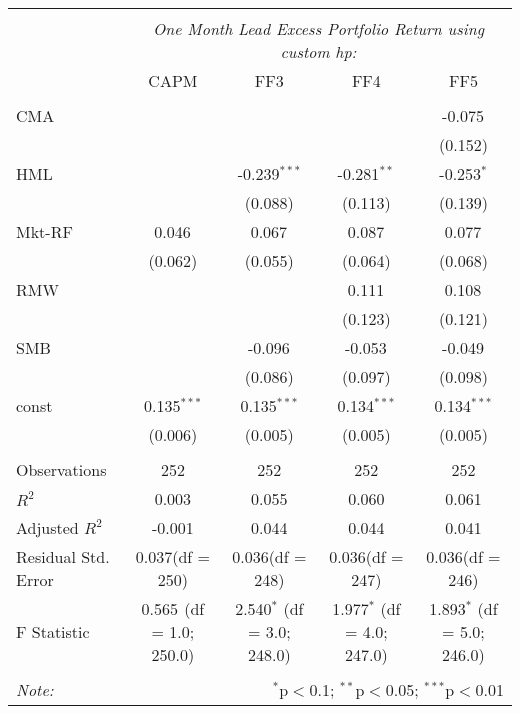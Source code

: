 \begin{table}[!htbp] \centering
\begin{tabular}{@{\extracolsep{5pt}}lcccc}
\\[-1.8ex]\hline
\hline \\[-1.8ex]
& \multicolumn{4}{c}{\textit{One Month Lead Excess Portfolio Return using custom hp:}} \
\cr \cline{4-5}
\\[-1.8ex] & CAPM & FF3 & FF4 & FF5 \\
\hline \\[-1.8ex]
 CMA & & & & -0.075$^{}$ \\
  & & & & (0.152) \\
 HML & & -0.239$^{***}$ & -0.281$^{**}$ & -0.253$^{*}$ \\
  & & (0.088) & (0.113) & (0.139) \\
 Mkt-RF & 0.046$^{}$ & 0.067$^{}$ & 0.087$^{}$ & 0.077$^{}$ \\
  & (0.062) & (0.055) & (0.064) & (0.068) \\
 RMW & & & 0.111$^{}$ & 0.108$^{}$ \\
  & & & (0.123) & (0.121) \\
 SMB & & -0.096$^{}$ & -0.053$^{}$ & -0.049$^{}$ \\
  & & (0.086) & (0.097) & (0.098) \\
 const & 0.135$^{***}$ & 0.135$^{***}$ & 0.134$^{***}$ & 0.134$^{***}$ \\
  & (0.006) & (0.005) & (0.005) & (0.005) \\
\hline \\[-1.8ex]
 Observations & 252 & 252 & 252 & 252 \\
 $R^2$ & 0.003 & 0.055 & 0.060 & 0.061 \\
 Adjusted $R^2$ & -0.001 & 0.044 & 0.044 & 0.041 \\
 Residual Std. Error & 0.037(df = 250) & 0.036(df = 248) & 0.036(df = 247) & 0.036(df = 246)  \\
 F Statistic & 0.565$^{}$ (df = 1.0; 250.0) & 2.540$^{*}$ (df = 3.0; 248.0) & 1.977$^{*}$ (df = 4.0; 247.0) & 1.893$^{*}$ (df = 5.0; 246.0) \\
\hline
\hline \\[-1.8ex]
\textit{Note:} & \multicolumn{4}{r}{$^{*}$p$<$0.1; $^{**}$p$<$0.05; $^{***}$p$<$0.01} \\
\end{tabular}
\end{table}
